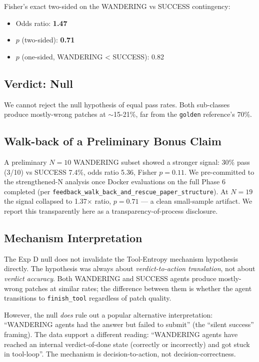 \documentclass[11pt]{article}
\begin{document}
Fisher's exact two-sided on the WANDERING vs SUCCESS contingency:
\begin{itemize}
\item Odds ratio: \textbf{1.47}
\item $p$ (two-sided): \textbf{0.71}
\item $p$ (one-sided, WANDERING < SUCCESS): 0.82
\end{itemize}

\subsection{Verdict: Null}

We cannot reject the null hypothesis of equal pass rates. Both sub-classes produce mostly-wrong patches at $\sim$15-21\%, far from the \texttt{golden} reference's 70\%.

\subsection{Walk-back of a Preliminary Bonus Claim}

A preliminary $N=10$ WANDERING subset showed a stronger signal: 30\% pass (3/10) vs SUCCESS 7.4\%, odds ratio 5.36, Fisher $p=0.11$. We pre-committed to the strengthened-N analysis once Docker evaluations on the full Phase 6 completed (per \texttt{feedback\_walk\_back\_and\_rescue\_paper\_structure}). At $N=19$ the signal collapsed to 1.37$\times$ ratio, $p=0.71$ --- a clean small-sample artifact. We report this transparently here as a transparency-of-process disclosure.

\subsection{Mechanism Interpretation}

The Exp D null does not invalidate the Tool-Entropy mechanism hypothesis directly. The hypothesis was always about \emph{verdict-to-action translation}, not about \emph{verdict accuracy}. Both WANDERING and SUCCESS agents produce mostly-wrong patches at similar rates; the difference between them is whether the agent transitions to \texttt{finish\_tool} regardless of patch quality.

However, the null \emph{does} rule out a popular alternative interpretation: ``WANDERING agents had the answer but failed to submit'' (the ``silent success'' framing). The data support a different reading: ``WANDERING agents have reached an internal verdict-of-done state (correctly or incorrectly) and got stuck in tool-loop''. The mechanism is decision-to-action, not decision-correctness.
\end{document}
